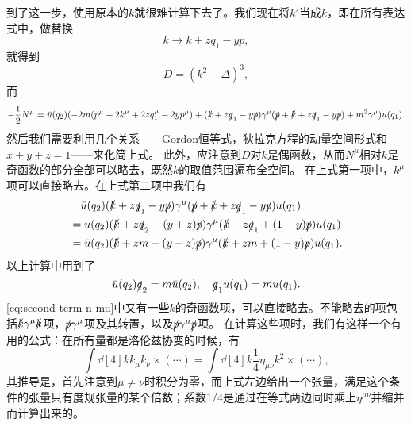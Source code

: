 到了这一步，使用原本的$k$就很难计算下去了。我们现在将$k'$当成$k$，即在所有表达式中，做替换
\begin{equation}
    k \longrightarrow k + z q_1 - y p,
    \label{sec:vertex-one-loop-k-replacement}
\end{equation}
就得到
\begin{equation}
    D = (k^2 - \Delta)^3,
    \label{eq:final-d}
\end{equation}
而
\begin{equation}
    - \frac{1}{2} N^\mu = \bar{u}(q_2) (- 2 m (p^\mu + 2 k^\mu + 2 z q_1^\mu - 2 y p^\mu) + (\slashed{k} + z \slashed{q}_1 - y \slashed{p}) \gamma^\mu (\slashed{p} + \slashed{k} + z \slashed{q}_1 - y \slashed{p}) + m^2 \gamma^\mu) u(q_1).
\end{equation}
然后我们需要利用几个关系——Gordon恒等式，狄拉克方程的动量空间形式和$x+y+z=1$——来化简上式。
此外，应注意到$D$对$k$是偶函数，从而$N^\mu$相对$k$是奇函数的部分全部可以略去，既然$k$的取值范围遍布全空间。
在上式第一项中，$k^\mu$项可以直接略去。在上式第二项中我们有
\begin{equation}
    \begin{aligned}
        &\quad \bar{u}(q_2) (\slashed{k} + z \slashed{q}_1 - y \slashed{p}) \gamma^\mu (\slashed{p} + \slashed{k} + z \slashed{q}_1 - y \slashed{p}) u(q_1) \\
        &= \bar{u}(q_2) (\slashed{k} + z \slashed{q}_2 - (y + z) \slashed{p}) \gamma^\mu (\slashed{k} + z \slashed{q}_1 + (1 - y) \slashed{p}) u(q_1) \\
        &= \bar{u}(q_2) (\slashed{k} + z m - (y + z) \slashed{p}) \gamma^\mu (\slashed{k} + z m + (1 - y) \slashed{p}) u(q_1).
    \end{aligned}
    \label{eq:second-term-n-mu}
\end{equation}
以上计算中用到了
\[
    \bar{u}(q_2) \slashed{q}_2 = m \bar{u}(q_2), \quad \slashed{q}_1 u(q_1) = m u(q_1).
\]
\eqref{eq:second-term-n-mu}中又有一些$k$的奇函数项，可以直接略去。不能略去的项包括$\slashed{k} \gamma^\mu \slashed{k}$项，$\slashed{p} \gamma^\mu$项及其转置，以及$\slashed{p} \gamma^\mu \slashed{p}$项。
在计算这些项时，我们有这样一个有用的公式：在所有量都是洛伦兹协变的时候，有
\begin{equation}
    \int \dd[4]{k} k_\mu k_\nu \times (\cdots) = \int \dd[4]{k} \frac{1}{4} \eta_{\mu \nu} k^2 \times (\cdots),
    \label{eq:k-mu-nu-to-square}
\end{equation}
其推导是，首先注意到$\mu \neq \nu$时积分为零，而上式左边给出一个张量，满足这个条件的张量只有度规张量的某个倍数；系数$1/4$是通过在等式两边同时乘上$\eta^{\mu \nu}$并缩并而计算出来的。
